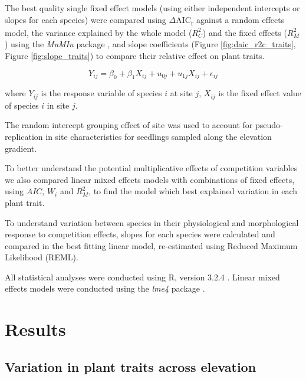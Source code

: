 \documentclass[a4paper, 11pt]{article}
\begin{document}
The best quality single fixed effect models (using either independent intercepts or slopes for each species) were compared using $\Delta$AIC\textsubscript{r} against a random effects model,  the variance explained by the whole model ($R_C^2$) and the fixed effects ($R_M^2$) using the \textit{MuMIn} package \citep{MuMIn}, and slope coefficients (Figure \ref{fig:daic_r2c_traits}, Figure \ref{fig:slope_traits}) to compare their relative effect on plant traits. 

\begin{equation}
\label{eq:model}
Y_{ij} = \beta_{0} + \beta_{1}X_{ij} + u_{0j} + u_{1j}X_{ij} + \epsilon_{ij}
\end{equation}

where $Y_{ij}$ is the response variable of species $i$ at site $j$, $X_{ij}$ is the fixed effect value of species $i$ in site $j$.



The random intercept grouping effect of site was used to account for pseudo-replication in site characteristics for seedlings sampled along the elevation gradient.

To better understand the potential multiplicative effects of competition variables we also compared linear mixed effects models with combinations of fixed effects, using $AIC$, $W_i$ and $R_M^2$, to find the model which best explained variation in each plant trait.

To understand variation between species in their physiological and morphological response to competition effects, slopes for each species were calculated and compared in the best fitting linear model, re-estimated using Reduced Maximum Likelihood (REML). 

All statistical analyses were conducted using R, version 3.2.4 \citep{R2019}. Linear mixed effects models were conducted using the \textit{lme4} package \citep{Bates2015}.

\section{Results}

\subsection{Variation in plant traits across elevation}
\end{document}
